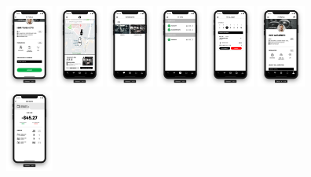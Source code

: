 \begin{figure}[H]
    \includegraphics[width=0.14\textwidth]{pfc/figuras/tr-register-profile-3.png}
    \includegraphics[width=0.14\textwidth]{pfc/figuras/tr-home-map.png}
    \includegraphics[width=0.14\textwidth]{pfc/figuras/tr-favorite.png}
    \includegraphics[width=0.14\textwidth]{pfc/figuras/tr-my-gyms.png}
    \includegraphics[width=0.14\textwidth]{pfc/figuras/tr-calendar.png}
    \includegraphics[width=0.14\textwidth]{pfc/figuras/tr-profile.png}
    \includegraphics[width=0.14\textwidth]{pfc/figuras/tr-dashboard.png}

\end{figure}
